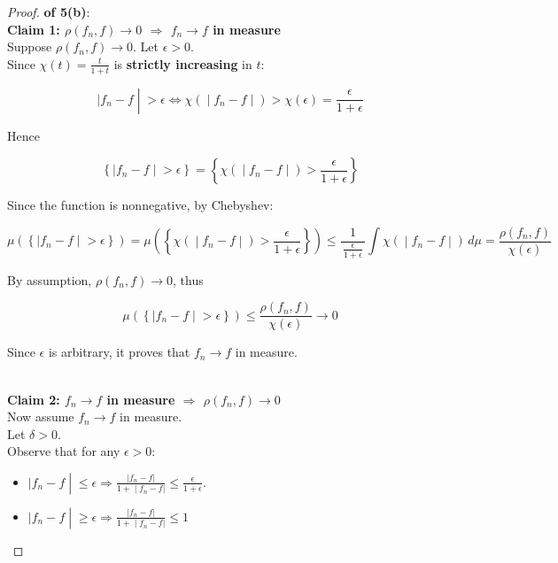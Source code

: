 \documentclass{qlnotes-export}
\begin{document}
\begin{proof}

\textbf{of 5(b)}:\\
\textbf{Claim 1: \(\rho(f_{n},f)\rightarrow 0\) \(\Longrightarrow\) \(f_{n}\rightarrow f\) in measure}\\
Suppose \(\rho(f_{n},f)\rightarrow 0\). Let \(\epsilon > 0\).\\
Since \(\chi(t) = \frac{t}{1 + t}\) is \textbf{strictly increasing} in \(t\):

\[\left. |f_{n} - f \middle| > \epsilon\Leftrightarrow\chi( \middle| f_{n} - f \middle| ) > \chi(\epsilon) = \frac{\epsilon}{1 + \epsilon} \right.\]

Hence

\[\left\{ |f_{n} - f \middle| > \epsilon \right\} = \left\{ \chi( \middle| f_{n} - f \middle| ) > \frac{\epsilon}{1 + \epsilon} \right\}\]

Since the function is nonnegative, by Chebyshev:

\[\left. \mu(\left\{ |f_{n} - f \middle| > \epsilon \right\}) = \mu(\left\{ \chi( \middle| f_{n} - f \middle| ) > \frac{\epsilon}{1 + \epsilon} \right\}) \leq \frac{1}{\,\frac{\epsilon}{1 + \epsilon}\,}\int\chi( \middle| f_{n} - f \middle| )\, d\mu = \frac{\rho(f_{n},f)}{\chi(\epsilon)} \right.\]

By assumption, \(\rho(f_{n},f)\rightarrow 0\), thus

\[\mu(\left\{ |f_{n} - f \middle| > \epsilon \right\}) \leq \frac{\rho(f_{n},f)}{\chi(\epsilon)}\rightarrow 0\]

Since \(\epsilon\) is arbitrary, it proves that \(f_{n}\rightarrow f\) in measure.\\
\strut \\
\textbf{Claim 2: \(f_{n}\rightarrow f\) in measure \(\Longrightarrow\) \(\rho(f_{n},f)\rightarrow 0\)}\\
Now assume \(f_{n}\rightarrow f\) in measure.\\
Let \(\delta > 0\).\\
Observe that for any \(\epsilon > 0\):

\begin{itemize}
\item
  \(\left. |f_{n} - f \middle| \leq \epsilon\Longrightarrow\frac{|f_{n} - f|}{\left. 1 + \middle| f_{n} - f| \right.} \leq \frac{\epsilon}{1 + \epsilon} \right.\).
\item
  \(\left. |f_{n} - f \middle| \geq \epsilon\Longrightarrow\frac{|f_{n} - f|}{\left. 1 + \middle| f_{n} - f| \right.} \leq 1 \right.\)
\end{itemize}


\end{proof}
\end{document}
